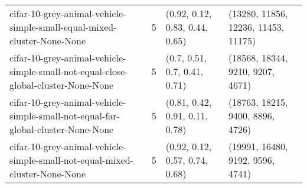 \begin{longtable}{llll}
                                      cifar-10-grey-animal-vehicle-simple-small-equal-mixed-cluster-None-None &              5 &                                                                                                                                                                                                                                                                            (0.92, 0.12, 0.83, 0.44, 0.65) &                                                                                                                                                                                                                                                                       (13280, 11856, 12236, 11453, 11175) \\
                           cifar-10-grey-animal-vehicle-simple-small-not-equal-close-global-cluster-None-None &              5 &                                                                                                                                                                                                                                                                              (0.7, 0.51, 0.7, 0.41, 0.71) &                                                                                                                                                                                                                                                                          (18568, 18344, 9210, 9207, 4671) \\
                             cifar-10-grey-animal-vehicle-simple-small-not-equal-far-global-cluster-None-None &              5 &                                                                                                                                                                                                                                                                            (0.81, 0.42, 0.91, 0.11, 0.78) &                                                                                                                                                                                                                                                                          (18763, 18215, 9400, 8896, 4726) \\
                                  cifar-10-grey-animal-vehicle-simple-small-not-equal-mixed-cluster-None-None &              5 &                                                                                                                                                                                                                                                                            (0.92, 0.12, 0.57, 0.74, 0.68) &                                                                                                                                                                                                                                                                          (19991, 16480, 9192, 9596, 4741) \\

\end{longtable}

